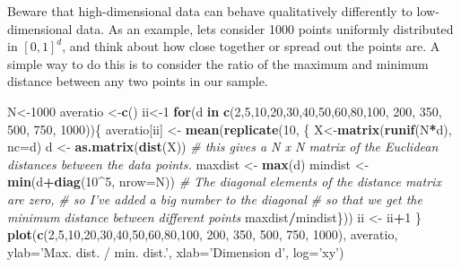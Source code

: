 \documentclass[]{book}
\newenvironment{Shaded}{\begin{snugshade}}{\end{snugshade}}
\newcommand{\CommentTok}[1]{\textcolor[rgb]{0.56,0.35,0.01}{\textit{#1}}}
\newcommand{\ControlFlowTok}[1]{\textcolor[rgb]{0.13,0.29,0.53}{\textbf{#1}}}
\newcommand{\DataTypeTok}[1]{\textcolor[rgb]{0.13,0.29,0.53}{#1}}
\newcommand{\DecValTok}[1]{\textcolor[rgb]{0.00,0.00,0.81}{#1}}
\newcommand{\KeywordTok}[1]{\textcolor[rgb]{0.13,0.29,0.53}{\textbf{#1}}}
\newcommand{\NormalTok}[1]{#1}
\newcommand{\OperatorTok}[1]{\textcolor[rgb]{0.81,0.36,0.00}{\textbf{#1}}}
\newcommand{\StringTok}[1]{\textcolor[rgb]{0.31,0.60,0.02}{#1}}
\theoremstyle{definition}
\theoremstyle{definition}
\theoremstyle{definition}
\theoremstyle{remark}
\begin{document}
Beware that high-dimensional data can behave qualitatively differently to low-dimensional data. As an example, lets consider 1000 points uniformly distributed in \([0,1]^d\), and think about how close together or spread out the points are. A simple way to do this is to consider the ratio of the maximum and minimum distance between any two points in our sample.

\begin{Shaded}
\begin{Highlighting}[]
\NormalTok{N<-}\DecValTok{1000}
\NormalTok{averatio <-}\KeywordTok{c}\NormalTok{()}
\NormalTok{ii<-}\DecValTok{1}
\ControlFlowTok{for}\NormalTok{(d }\ControlFlowTok{in} \KeywordTok{c}\NormalTok{(}\DecValTok{2}\NormalTok{,}\DecValTok{5}\NormalTok{,}\DecValTok{10}\NormalTok{,}\DecValTok{20}\NormalTok{,}\DecValTok{30}\NormalTok{,}\DecValTok{40}\NormalTok{,}\DecValTok{50}\NormalTok{,}\DecValTok{60}\NormalTok{,}\DecValTok{80}\NormalTok{,}\DecValTok{100}\NormalTok{, }\DecValTok{200}\NormalTok{, }\DecValTok{350}\NormalTok{, }\DecValTok{500}\NormalTok{, }\DecValTok{750}\NormalTok{, }\DecValTok{1000}\NormalTok{))\{}
\NormalTok{  averatio[ii] <-}\StringTok{ }\KeywordTok{mean}\NormalTok{(}\KeywordTok{replicate}\NormalTok{(}\DecValTok{10}\NormalTok{, \{}
\NormalTok{  X<-}\KeywordTok{matrix}\NormalTok{(}\KeywordTok{runif}\NormalTok{(N}\OperatorTok{*}\NormalTok{d), }\DataTypeTok{nc=}\NormalTok{d)}
\NormalTok{  d <-}\StringTok{ }\KeywordTok{as.matrix}\NormalTok{(}\KeywordTok{dist}\NormalTok{(X)) }
  \CommentTok{# this gives a N x N matrix of the Euclidean distances between the data points.}
\NormalTok{  maxdist <-}\StringTok{ }\KeywordTok{max}\NormalTok{(d) }
\NormalTok{  mindist <-}\StringTok{ }\KeywordTok{min}\NormalTok{(d}\OperatorTok{+}\KeywordTok{diag}\NormalTok{(}\DecValTok{10}\OperatorTok{^}\DecValTok{5}\NormalTok{, }\DataTypeTok{nrow=}\NormalTok{N)) }
  \CommentTok{# The diagonal elements of the distance matrix are zero,}
  \CommentTok{# so I've added a big number to the diagonal }
  \CommentTok{# so that we get the minimum distance between different points}
\NormalTok{  maxdist}\OperatorTok{/}\NormalTok{mindist\}))}
\NormalTok{  ii <-}\StringTok{ }\NormalTok{ii}\OperatorTok{+}\DecValTok{1}
\NormalTok{\}}
\KeywordTok{plot}\NormalTok{(}\KeywordTok{c}\NormalTok{(}\DecValTok{2}\NormalTok{,}\DecValTok{5}\NormalTok{,}\DecValTok{10}\NormalTok{,}\DecValTok{20}\NormalTok{,}\DecValTok{30}\NormalTok{,}\DecValTok{40}\NormalTok{,}\DecValTok{50}\NormalTok{,}\DecValTok{60}\NormalTok{,}\DecValTok{80}\NormalTok{,}\DecValTok{100}\NormalTok{, }\DecValTok{200}\NormalTok{, }\DecValTok{350}\NormalTok{, }\DecValTok{500}\NormalTok{, }\DecValTok{750}\NormalTok{, }\DecValTok{1000}\NormalTok{), }
\NormalTok{     averatio, }\DataTypeTok{ylab=}\StringTok{'Max. dist. / min. dist.'}\NormalTok{, }\DataTypeTok{xlab=}\StringTok{'Dimension d'}\NormalTok{, }\DataTypeTok{log=}\StringTok{'xy'}\NormalTok{)}
\end{Highlighting}
\end{Shaded}
\end{document}
